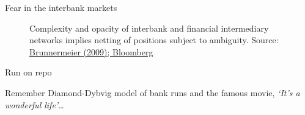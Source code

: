 

\begin{frame}{Fear in the interbank markets}

\begin{figure}
\begin{center}


\caption{\label{fig:L4_swap_net_vs_gross} Complexity and opacity of interbank and financial intermediary networks implies netting of positions subject to ambiguity. Source: \href{https://www.princeton.edu/~markus/research/papers/liquidity_credit_crunch.pdf}{Brunnermeier (2009); Bloomberg}}

\end{center}
\end{figure}

\end{frame}



\begin{frame}{Run on repo}

Remember Diamond-Dybvig model of bank runs and the famous movie, \emph{`It's a wonderful life'}\ldots

\end{frame}

